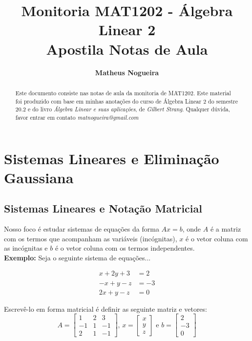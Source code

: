 \documentclass[12pt]{article}
\title{\textbf{Monitoria MAT1202 - Álgebra Linear 2 \\Apostila Notas de Aula }}
\author[]{\textbf{Matheus Nogueira}}
\date{}
\begin{document}
	\maketitle
	\begin{abstract}
		Este documento consiste nas notas de aula da monitoria de MAT1202. Este material foi produzido com base em minhas anotações do curso de Álgebra Linear 2 do semestre 20.2 e do livro \textit{Álgebra Linear e suas aplicações}, de \textit{Gilbert Strang}. Qualquer dúvida, favor entrar em contato \textit{matnogueira@gmail.com}
	\end{abstract}
	\tableofcontents
	\pagebreak
	\section{Sistemas Lineares e Eliminação Gaussiana}
	\subsection{Sistemas Lineares e Notação Matricial}
	
	Nosso foco é estudar sistemas de equações da forma $Ax=b$, onde $A$ é a matriz com os termos que acompanham as variáveis (incógnitas), $x$ é o vetor coluna com as incógnitas e $b$ é o vetor coluna com os termos independentes.\\
	
	\textbf{Exemplo:} Seja o seguinte sistema de equações...
	
	\begin{align*}
		x+2y+3&=2\\-x+y-z&=-3\\2x+y-z&=0
	\end{align*}
	
	Escrevê-lo em forma matricial é definir as seguinte matriz e vetores:
	\begin{equation*}
		A=
		\begin{bmatrix}
			1 & 2 & 3\\
			-1 & 1 & -1\\
			2 & 1 & -1
		\end{bmatrix} \mbox{, } 
		x=
		\begin{bmatrix}
			x\\ y\\z
		\end{bmatrix} \mbox{ e } 
		b=
		\begin{bmatrix}
			2 \\ -3\\0
		\end{bmatrix}
	\end{equation*}
	
\end{document}
